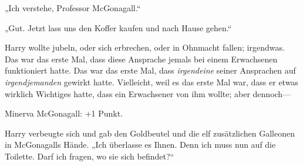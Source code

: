 „Ich verstehe, Professor McGonagall.“

„Gut. Jetzt lass uns den Koffer kaufen und nach Hause gehen.“

Harry wollte jubeln, oder sich erbrechen, oder in Ohnmacht fallen; irgendwas. Das war das erste Mal, dass diese Ansprache jemals bei einem Erwachsenen funktioniert hatte. Das war das erste Mal, dass \emph{irgendeine} seiner Ansprachen auf \emph{irgendjemanden} gewirkt hatte. Vielleicht, weil es das erste Mal war, dass er etwas wirklich Wichtiges hatte, dass ein Erwachsener von ihm wollte; aber dennoch—

Minerva McGonagall: +1 Punkt.

Harry verbeugte sich und gab den Goldbeutel und die elf zusätzlichen Galleonen in McGonagalls Hände. „Ich überlasse es Ihnen. Denn ich muss nun auf die Toilette. Darf ich fragen, wo sie sich befindet?“

